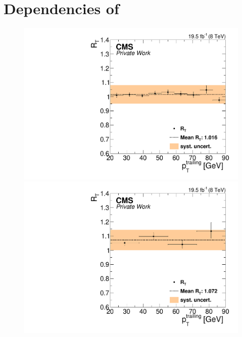 \chapter{Dependencies of \RT}
\label{app:RT}


\begin{figure}[htbp]
\centering
\begin{minipage}[t]{0.49\textwidth}
  \includegraphics[width=\textwidth]{plots/BG/trigger/Triggereff_SFvsOF_Syst_AlphaT_HighHTExclusiveCentral_Full2012_TrailingPt_leadingPt20.pdf}
\end{minipage}
\begin{minipage}[t]{0.49\textwidth}
\includegraphics[width=\textwidth]{plots/BG/trigger/Triggereff_SFvsOF_Syst_AlphaT_HighHTExclusiveForward_Full2012_TrailingPt_leadingPt20.pdf}
\end{minipage}

\end{figure}
